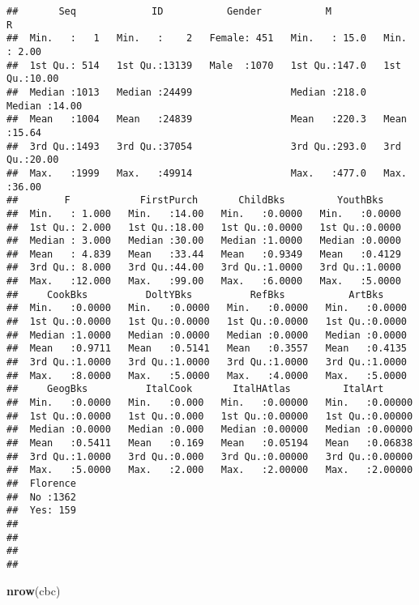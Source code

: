 \documentclass[
]{article}
\newenvironment{Shaded}{\begin{snugshade}}{\end{snugshade}}
\newcommand{\FunctionTok}[1]{\textcolor[rgb]{0.13,0.29,0.53}{\textbf{#1}}}
\newcommand{\NormalTok}[1]{#1}
\begin{document}
\begin{verbatim}
##       Seq             ID           Gender           M               R        
##  Min.   :   1   Min.   :    2   Female: 451   Min.   : 15.0   Min.   : 2.00  
##  1st Qu.: 514   1st Qu.:13139   Male  :1070   1st Qu.:147.0   1st Qu.:10.00  
##  Median :1013   Median :24499                 Median :218.0   Median :14.00  
##  Mean   :1004   Mean   :24839                 Mean   :220.3   Mean   :15.64  
##  3rd Qu.:1493   3rd Qu.:37054                 3rd Qu.:293.0   3rd Qu.:20.00  
##  Max.   :1999   Max.   :49914                 Max.   :477.0   Max.   :36.00  
##        F            FirstPurch       ChildBks         YouthBks     
##  Min.   : 1.000   Min.   :14.00   Min.   :0.0000   Min.   :0.0000  
##  1st Qu.: 2.000   1st Qu.:18.00   1st Qu.:0.0000   1st Qu.:0.0000  
##  Median : 3.000   Median :30.00   Median :1.0000   Median :0.0000  
##  Mean   : 4.839   Mean   :33.44   Mean   :0.9349   Mean   :0.4129  
##  3rd Qu.: 8.000   3rd Qu.:44.00   3rd Qu.:1.0000   3rd Qu.:1.0000  
##  Max.   :12.000   Max.   :99.00   Max.   :6.0000   Max.   :5.0000  
##     CookBks          DoltYBks          RefBks           ArtBks      
##  Min.   :0.0000   Min.   :0.0000   Min.   :0.0000   Min.   :0.0000  
##  1st Qu.:0.0000   1st Qu.:0.0000   1st Qu.:0.0000   1st Qu.:0.0000  
##  Median :1.0000   Median :0.0000   Median :0.0000   Median :0.0000  
##  Mean   :0.9711   Mean   :0.5141   Mean   :0.3557   Mean   :0.4135  
##  3rd Qu.:1.0000   3rd Qu.:1.0000   3rd Qu.:1.0000   3rd Qu.:1.0000  
##  Max.   :8.0000   Max.   :5.0000   Max.   :4.0000   Max.   :5.0000  
##     GeogBks          ItalCook       ItalHAtlas         ItalArt       
##  Min.   :0.0000   Min.   :0.000   Min.   :0.00000   Min.   :0.00000  
##  1st Qu.:0.0000   1st Qu.:0.000   1st Qu.:0.00000   1st Qu.:0.00000  
##  Median :0.0000   Median :0.000   Median :0.00000   Median :0.00000  
##  Mean   :0.5411   Mean   :0.169   Mean   :0.05194   Mean   :0.06838  
##  3rd Qu.:1.0000   3rd Qu.:0.000   3rd Qu.:0.00000   3rd Qu.:0.00000  
##  Max.   :5.0000   Max.   :2.000   Max.   :2.00000   Max.   :2.00000  
##  Florence  
##  No :1362  
##  Yes: 159  
##            
##            
##            
## 
\end{verbatim}

\begin{Shaded}
\begin{Highlighting}[]
\FunctionTok{nrow}\NormalTok{(cbc)}
\end{Highlighting}
\end{Shaded}
\end{document}
